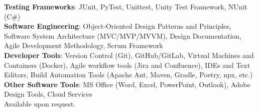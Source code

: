 \textbf{Testing Frameworks}: JUnit, PyTest, 
Unittest, Unity Test Framework, NUnit (C\#)\\
\textbf{Software Engineering}: 
Object-Oriented Design Patterns and Principles, 
Software System Architecture (MVC/MVP/MVVM), Design Documentation, 
Agile Development Methodology, Scrum Framework\\
\textbf{Developer Tools}: Version Control (Git), GitHub/GitLab, 
Virtual Machines and Containers (Docker), 
Agile workflow tools (Jira and Confluence), 
IDEs and Text Editors, 
Build Automation Tools (Apache Ant, Maven, Gradle, Poetry, npx, etc.)\\
\textbf{Other Software Tools}: MS Office (Word, Excel, PowerPoint, Outlook), 
Adobe Design Tools, Cloud Services\\

Available upon request.



